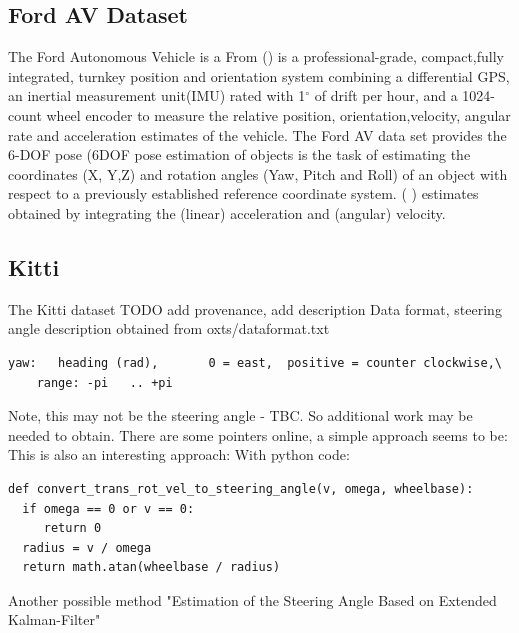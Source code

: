 \subsection{Ford AV Dataset}
The Ford Autonomous Vehicle is a 
From %
 (\cite{Applanix}) is a professional-grade, compact,fully  integrated,  turnkey  position  and  orientation  system combining a differential GPS, an inertial measurement unit(IMU)  rated  with  1$^{\circ}$ of  drift  per  hour,  and  a  1024-count wheel encoder to measure the relative position, orientation,velocity,  angular  rate  and  acceleration  estimates  of  the vehicle. The Ford AV data set provides the 6-DOF pose (6DOF pose estimation of objects is the task of estimating the coordinates (X, Y,Z) and rotation angles (Yaw, Pitch and Roll) of an object with respect to a previously established reference coordinate system. (\cite{7005077} ) estimates obtained by integrating the (linear) acceleration and (angular) velocity.


\subsection{Kitti}

The Kitti dataset TODO add provenance, add description
Data format, steering angle description obtained from oxts/dataformat.txt 
\begin{verbatim}
yaw:   heading (rad),       0 = east,  positive = counter clockwise,\
    range: -pi   .. +pi
\end{verbatim}
Note, this may not be the steering angle - TBC. So additional work may be needed to obtain.
There are some pointers online, a simple approach seems to be:
This is also an interesting approach:
With python code:
\begin{verbatim}
def convert_trans_rot_vel_to_steering_angle(v, omega, wheelbase):
  if omega == 0 or v == 0:
     return 0
  radius = v / omega
  return math.atan(wheelbase / radius)    
\end{verbatim}
Another possible method "Estimation of the Steering Angle Based on Extended Kalman-Filter"  

